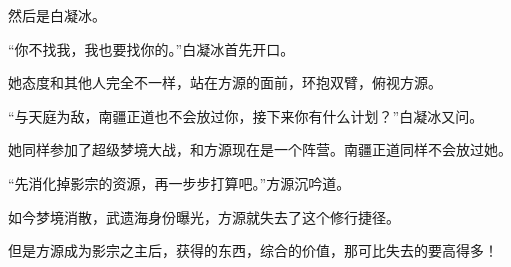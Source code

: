\begin{this_body}
然后是白凝冰。

“你不找我，我也要找你的。”白凝冰首先开口。

她态度和其他人完全不一样，站在方源的面前，环抱双臂，俯视方源。

“与天庭为敌，南疆正道也不会放过你，接下来你有什么计划？”白凝冰又问。

她同样参加了超级梦境大战，和方源现在是一个阵营。南疆正道同样不会放过她。

“先消化掉影宗的资源，再一步步打算吧。”方源沉吟道。

如今梦境消散，武遗海身份曝光，方源就失去了这个修行捷径。

但是方源成为影宗之主后，获得的东西，综合的价值，那可比失去的要高得多！

\end{this_body}

